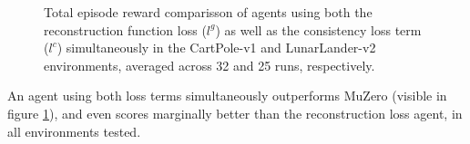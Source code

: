 \begin{figure}[ht]
    \caption{Total episode reward comparisson of agents using both the reconstruction function loss ($l^g$) as well as the consistency loss term ($l^c$) simultaneously in the CartPole-v1 and LunarLander-v2 environments, averaged across 32 and 25 runs, respectively.}
    \label{fig:hybrid_results}
\end{figure}

An agent using both loss terms simultaneously outperforms MuZero (visible in figure \ref{fig:hybrid_results}), and even scores marginally better than the reconstruction loss agent, in all environments tested.